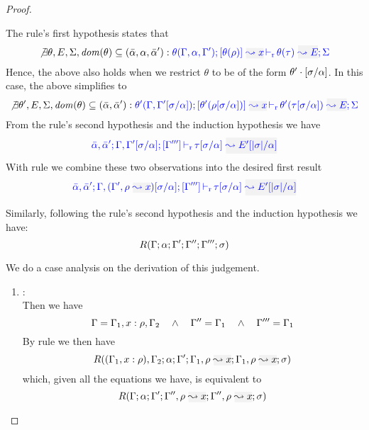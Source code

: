 \begin{proof}
\begin{description}
The rule's first hypothesis states that
\begin{equation*}
  \not\exists \theta, E, \Sigma, \mathit{dom}(\theta) \subseteq (\bar{\alpha},\alpha,\bar{\alpha}'):
  \dmres{\theta(\tenv,\alpha,\tenv')}{\theta(\rulet)}{x}{\theta(\type)}{E}{\Sigma}
\end{equation*}
  Hence, the above also holds when we restrict $\theta$ to be of the form
$\theta' \cdot [\sigma/\alpha]$. In this case, the above simplifies to
\begin{equation*}
  \not\exists \theta', E, \Sigma, \mathit{dom}(\theta) \subseteq (\bar{\alpha},\bar{\alpha}'):
  \dmres{\theta'(\tenv,\tenv'[\suty/\alpha])}{\theta'(\rulet[\suty/\alpha])}{x}{\theta'(\type[\suty/\alpha])}{E}{\Sigma}
\end{equation*}
  From the rule's second hypothesis and the induction hypothesis we have
\begin{equation*}
  \dlres{\bar{\alpha},\bar{\alpha}'}{\tenv,\tenv'[\suty/\alpha]}{\tenv'''}{\type[\suty/\alpha]}{E'[|\suty|/\alpha]}
\end{equation*}
  With rule  we combine these two observations into the desired first result
\begin{equation*}
  \dlres{\bar{\alpha},\bar{\alpha}'}{\tenv,(\tenv',\ie{\rulet}{x})[\suty/\alpha]}{\tenv'''}{\type[\suty/\alpha]}{E'[|\suty|/\alpha]}
\end{equation*}

  Similarly, following the rule's second hypothesis and the induction hypothesis we have:
\begin{equation*}
  R(\Gamma;\alpha;\Gamma';\Gamma'';\Gamma''';\sigma)
\end{equation*}

  We do a case analysis on the derivation of this judgement.
  \begin{enumerate}
  \item {}: \\ Then we have
\begin{equation*}
  \Gamma = \Gamma_1,x:\rho,\Gamma_2  \quad\wedge\quad \Gamma'' = \Gamma_1 \quad\wedge\quad \Gamma''' = \Gamma_1
\end{equation*}
       By rule  we then have
\begin{equation*}
R((\tenv_1,x:\rulet),\tenv_2;\alpha;\tenv';\tenv_1,\ie{\rulet}{x};\tenv_1,\ie{\rulet}{x};\suty)
\end{equation*}
        which, given all the equations we have, is equivalent to
\begin{equation*}
R(\tenv;\alpha;\tenv';\tenv'',\ie{\rulet}{x};\tenv'',\ie{\rulet}{x};\suty)
\end{equation*}


\end{enumerate}
\end{description}
\end{proof}
